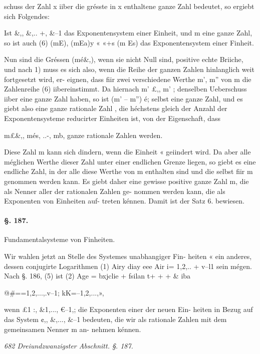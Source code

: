 \documentclass[12pt,a4paper]{article}
\theoremstyle{plain}
\theoremstyle{definition}
\begin{document}

schuss der Zahl x iiber die grésste in x enthaltene ganze Zahl bedeutet, so ergiebt sich Folgendes:

Ist \&,, \&,.. +, \&--1 das Exponentensystem einer Einheit, und m eine ganze Zahl, so ist auch (6) (mE), (mEa)y « «+s (m Es) das Exponentensystem einer Finheit.

Nun sind die Gréssen (mé\&,), wenn sie nicht Null sind, positive echte Briiche, und nach 1) muss es sich also, wenn die Reihe der ganzen Zahlen hinlanglich weit fortgesetzt wird, er- eignen, dass fiir zwei verschiedene Werthe m', m'' von m die Zahlenreihe (6) iibereinstimmt. Da hiernach m' £,, m' ; denselben Ueberschuss iiber eine ganze Zahl haben, so ist (m' -- m'') é; selbst eine ganze Zahl, und es giebt also eine ganze rationale Zahl , die héchstens gleich der Anzahl der Exponentensysteme reducirter Einheiten ist, von der Eigenschaft, dass

m£\&,, més, ..-, mb, ganze rationale Zahlen werden.

Diese Zahl m kann sich dindern, wenn die Einheit « geiindert wird. Da aber alle méglichen Werthe dieser Zahl unter einer endlichen Grenze liegen, so giebt es eine endliche Zahl, in der alle diese Werthe von m enthalten sind und die selbst fiir m genommen werden kann. Es giebt daher eine gewisse positive ganze Zahl m, die als Nenner aller der rationalen Zahlen ge- nommen werden kann, die als Exponenten von Einheiten auf- treten kénnen. Damit ist der Satz 6. bewiesen.

\paragraph{§. 187.}

Fundamentalsysteme von Finheiten.

Wir wahlen jetzt an Stelle des Systemes unabhangiger Fin- heiten « ein anderes, dessen conjugirte Logarithmen (1) Airy diay eee Air i= 1,2,.. + v--l1 sein mégen. Nach §. 186, (5) ist (2) Age = bxjclie + fsilan t+ + + \& iba

@\#==1,2,...,.v--1; kK=--1,2,...,»,

wenn £1 :, \&1,..., €--1,; die Exponenten einer der neuen Ein- heiten in Bezug auf das System ¢,, \&,..., \&--1 bedeuten, die wir als rationale Zahlen mit dem gemeinsamen Nenner m an- nehmen kénnen.

\vspace{0.5\baselineskip}\noindent\textit{682 Dreiundzwanzigster Abschnitt. §. 187.}\par
\end{document}
